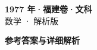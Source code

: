 \documentclass[zihao=-4, a4paper]{ctexart}
\begin{document}
\begin{center}
  {\Large\bfseries 1977 年·福建卷·文科}\\[4pt]
  {\large 数学 · 解析版}
\end{center}
\medskip
{}

\clearpage
{}
\begin{center}{\Large\bfseries 参考答案与详细解析}\end{center}
\medskip

\end{document}
